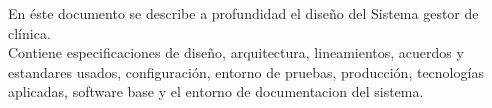 


En \'este documento se describe a profundidad el diseño del Sistema gestor de cl\'inica.\\
Contiene especificaciones de diseño, arquitectura, lineamientos, acuerdos y estandares usados, configuraci\'on, entorno de pruebas, producci\'on, tecnolog\'ias aplicadas, software base y el entorno de documentacion del sistema. 



